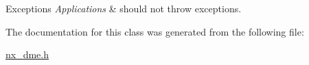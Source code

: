\begin{DoxyExceptions}{Exceptions}
{\em Applications} & should not throw exceptions. \\
\hline
\end{DoxyExceptions}


The documentation for this class was generated from the following file\+:\begin{DoxyCompactItemize}
\item 
\mbox{\hyperlink{nx__dme_8h}{nx\+\_\+dme.\+h}}\end{DoxyCompactItemize}
